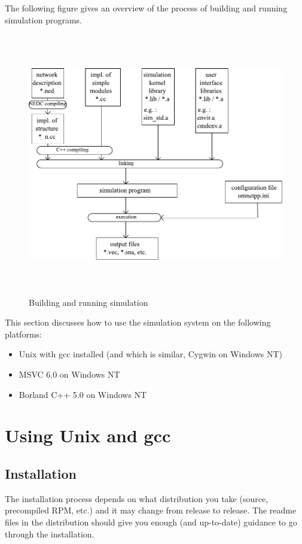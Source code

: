 The following figure gives an overview of the process of building 
and running simulation programs.


\begin{figure}[htbp]
  \begin{center}
    \includegraphics[width=5.992in, height=4.519in]{figures/usmanFig17}
    \caption{Building and running simulation}
  \end{center}
\end{figure}


This section discusses how to use the simulation system on the 
following platforms:
\begin{itemize}
  \item{Unix with gcc installed (and which is similar, Cygwin on Windows 
    NT)}
  \item{MSVC 6.0 on Windows NT}
  \item{Borland C++ 5.0 on Windows NT}
\end{itemize}




\section{Using Unix and gcc}

\subsection{Installation}

The installation process depends on what distribution you take 
(source, precompiled RPM, etc.) and it may change from release 
to release. The readme files in the distribution should give 
you enough (and up-to-date) guidance to go through the installation.





